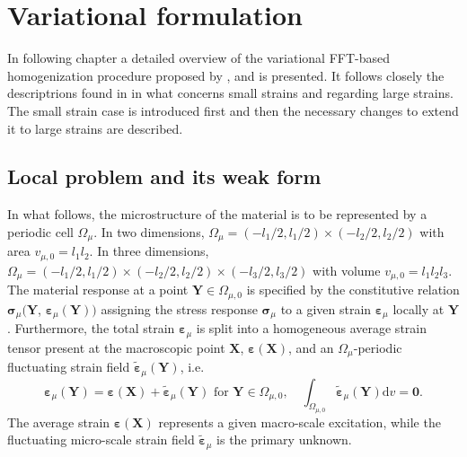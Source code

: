 \chapter{Variational formulation} \label{chapter:variational_fft}

In following chapter a detailed overview of the variational FFT-based homogenization procedure proposed by \cite{vondrejc_fft-based_2014}, \cite{zeman_finite_2017} and \cite{de_geus_finite_2017} is presented.
It follows closely the descriptrions found in \cite{zeman_finite_2017} in what concerns small strains and \cite{de_geus_finite_2017} regarding large strains.
The small strain case is introduced first and then the necessary changes to extend it to large strains are described.


\section{Local problem and its weak form}

In what follows, the microstructure of the material is to be represented by a periodic cell \(\Omega_\mu\). In two dimensions, \(\Omega_\mu=\left(-l_{1} / 2, l_{1} / 2\right) \times\left(-l_{2} / 2, l_{2} / 2\right)\) with area \(v_{\mu,0}=l_{1} l_{2}\).
In three dimensions, \(\Omega_\mu=\left(-l_{1} / 2, l_{1} / 2\right) \times\left(-l_{2} / 2, l_{2} / 2\right)\times\left(-l_{3} / 2, l_{3} / 2\right)\) with volume \(v_{\mu,0}=l_{1} l_{2} l_{3}\).
The material response at a point \(\bm Y \in \Omega_{\mu,0}\) is specified by the constitutive relation \(\bm{\sigma}_\mu(\bm{Y}\), \(\bm\varepsilon_\mu(\bm{Y}))\) assigning the stress response \(\bm{\sigma}_\mu\) to a given strain \(\bm\varepsilon_\mu\) locally at \(\bm Y\).
Furthermore, the total strain \(\bm \varepsilon_\mu\) is split into a homogeneous average strain tensor present at the macroscopic point \(\bm X\), \(\bm \varepsilon(\bm X)\), and an \(\Omega_\mu\)-periodic fluctuating strain field \(\tilde{\bm \varepsilon}_\mu(\bm Y)\), i.e.
\begin{equation}
\bm\varepsilon_\mu(\bm{Y})=\bm \varepsilon(\bm X)+\tilde{\bm \varepsilon}_\mu(\bm{Y}) \text { for } \bm Y \in \Omega_{\mu,0}, \quad \int_{\Omega_{\mu,0} } \tilde{\bm\varepsilon}_\mu(\bm{Y}) \mathrm{d} v=\bm{0}.
\end{equation}
The average strain \(\bm \varepsilon(\bm X)\) represents a given macro-scale excitation, while the fluctuating micro-scale strain field \(\tilde{\bm\varepsilon}_\mu\) is the primary unknown.

